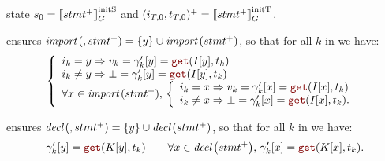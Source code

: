 \begin{skippableproof}
\begin{itemize}
\begin{itemize}
                         state $s_0 = \left\llbracket stmt^+ \right\rrbracket_G^\text{initS}$ and
                        $(i_{T, 0}, t_{T, 0})^+ = \left\llbracket stmt^+ \right\rrbracket_G^\text{initT}$.

                         ensures
                        ${\textit{import}\left(, stmt^+\right)} = \{y\} \cup {\ensuremath{\textit{import}\left(stmt^+\right)}}$, so that
                        for all $k$ in \N we have:
                        \begin{equation*}
                            \left\{\begin{array}{l}
                                i_k = y \Rightarrow v_k = \gamma'_k[y] = \getAt{I[y]}{t_k}     \\
                                i_k \neq y \Rightarrow \bot = \gamma'_k[y] = \getAt{I[y]}{t_k} \\
                                \forall x \in \importSet{stmt^+}, \,
                                \left\{\begin{array}{l}
                                           i_k = x \Rightarrow v_k = \gamma'_k[x] = \getAt{I[x]}{t_k} \\
                                           i_k \neq x \Rightarrow \bot = \gamma'_k[x] = \getAt{I[x]}{t_k}.
                                       \end{array}\right.
                            \end{array}\right.
                        \end{equation*}

                         ensures
                        ${\textit{decl}\left(, stmt^+\right)} = \{y\} \cup {\ensuremath{\textit{decl}\left(stmt^+\right)}}$, so that for
                        all $k$ in \N we have:
                        \begin{equation*}
                            \gamma'_k[y] = \getAt{K[y]}{t_k} \qquad
                            \forall x \in \declSet{stmt^+}, \, \gamma'_k[x] = \getAt{K[x]}{t_k}.
                        \end{equation*}


\end{itemize}
\end{itemize}
\end{skippableproof}
